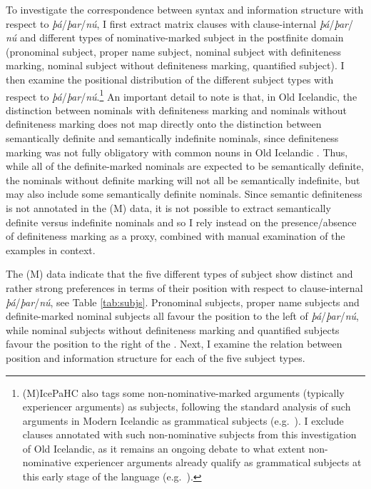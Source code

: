 \documentclass[output=paper,colorlinks,citecolor=brown]{langscibook}
\begin{document}
To investigate the correspondence between syntax and information structure with respect to \textit{þá}/\textit{þar}/\textit{nú}, I first extract matrix clauses with clause-internal \textit{þá}/\textit{þar}/ \textit{nú} and different types of nominative-marked subject in the postfinite domain (pronominal subject, proper name subject, nominal subject with definiteness marking, nominal subject without definiteness marking, quantified subject). I then examine the positional distribution of the different subject types with respect to \textit{þá}/\textit{þar}/\textit{nú}.\footnote{(M)IcePaHC also tags some non-nominative-marked arguments (typically experiencer arguments) as subjects, following the standard analysis of such arguments in Modern Icelandic as grammatical subjects (e.g.~\citealp{zmt1985}). I exclude clauses annotated with such non-nominative subjects from this investigation of Old Icelandic, as it remains an ongoing debate to what extent non-nominative experiencer arguments already qualify as grammatical subjects at this early stage of the language (e.g.~\citealp{barddal-eythorsson03,barthdal-tholly09,barddaletal2012,schaetzleetal15,schaetzle2018}).}
An important detail to note is that, in Old Icelandic, the distinction between nominals with definiteness marking and nominals without definiteness marking does not map directly onto the distinction between semantically definite and semantically indefinite nominals, since definiteness marking was not fully obligatory with common nouns in Old Icelandic \citep{leiss2000artikel,leiss2007covert,Borjarsetal16}.
Thus, while all of the definite-marked nominals are expected to be semantically definite, the nominals without definite marking will not all be semantically indefinite, but may also include some semantically definite nominals. Since semantic definiteness is not annotated in the (M) data, it is not possible to extract semantically definite versus indefinite nominals and so I rely instead on the presence/absence of definiteness marking as a proxy, combined with manual examination of the examples in context. 

The (M) data indicate that the five different types of subject show distinct and rather strong preferences in terms of their position with respect to clause-internal \textit{þá}/\textit{þar}/\textit{nú}, see Table \ref{tab:subjs}. Pronominal subjects, proper name subjects and definite-marked nominal subjects all favour the position to the left of \textit{þá}/\textit{þar}/\textit{nú}, while nominal subjects without definiteness marking and quantified subjects favour the position to the right of the . Next, I examine the relation between position and information structure for each of the five subject types.
\end{document}
